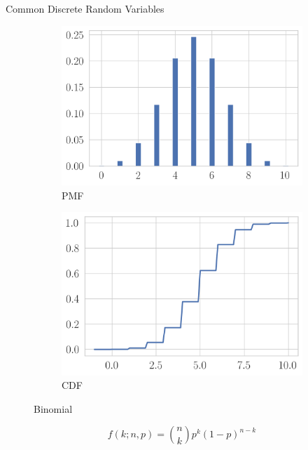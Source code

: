 \documentclass[11pt, xcolor={dvipsnames}, hyperref={colorlinks, allcolors=Blue}]{beamer}
\begin{document}
\begin{frame}{Common Discrete Random Variables}

\begin{figure}[t]
	\begin{subfigure}[b]{0.4\textwidth}
		\centering
		\includegraphics[width=\textwidth]{binomial_pmf.png}
		\caption*{PMF}
	\end{subfigure}
	\begin{subfigure}[b]{0.4\textwidth}
		\centering
		\includegraphics[width=\textwidth]{binomial_cdf.png}
		\caption*{CDF}
	\end{subfigure}
\caption{Binomial}
\end{figure}


\[f(k; n, p) = \binom{n}{k} p^{k} (1-p)^{n-k}\]

\end{frame}
\end{document}

